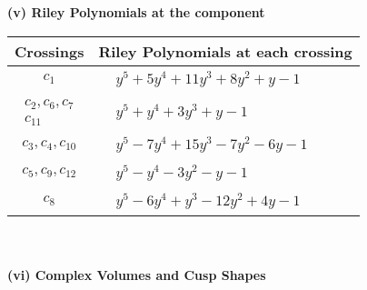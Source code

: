 \documentclass[1p]{elsarticle_modified}
\theoremstyle{definition}
\begin{document}
\newpage\renewcommand{\arraystretch}{1}
\flushleft \textbf{(v) Riley Polynomials at the component}\newline \\
\begin{tabular}{m{50pt}|m{274pt}}
Crossings & \hspace{64pt}Riley Polynomials at each crossing \\
\hline $$\begin{aligned}c_{1}\end{aligned}$$&$\begin{aligned}
&y^5+5 y^4+11 y^3+8 y^2+y-1
\end{aligned}$\\
\hline $$\begin{aligned}c_{2},c_{6},c_{7}\\c_{11}\end{aligned}$$&$\begin{aligned}
&y^5+y^4+3 y^3+y-1
\end{aligned}$\\
\hline $$\begin{aligned}c_{3},c_{4},c_{10}\end{aligned}$$&$\begin{aligned}
&y^5-7 y^4+15 y^3-7 y^2-6 y-1
\end{aligned}$\\
\hline $$\begin{aligned}c_{5},c_{9},c_{12}\end{aligned}$$&$\begin{aligned}
&y^5- y^4-3 y^2- y-1
\end{aligned}$\\
\hline $$\begin{aligned}c_{8}\end{aligned}$$&$\begin{aligned}
&y^5-6 y^4+y^3-12 y^2+4 y-1
\end{aligned}$\\
\hline
\end{tabular}\\~\\
\newpage\flushleft \textbf{(vi) Complex Volumes and Cusp Shapes}
\end{document}
